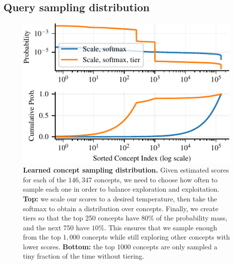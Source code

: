 \subsection{Query sampling distribution}
\label{subsec:tiering}

\begin{figure}[t]
    \centering
    \includegraphics[width=0.7\linewidth]{figures/sampling_dist_shorter.pdf}
    \caption{\textbf{Learned concept sampling distribution.} Given estimated scores for each of the $146{,}347$ concepts, we need to choose how often to sample each one in order to balance exploration and exploitation.
    \textbf{Top:} we scale our scores to a desired temperature, then take the softmax to obtain a distribution over concepts. Finally, we create tiers so that the top 250 concepts have $80\%$ of the probability mass, and the next 750 have $10\%$. This ensures that we sample enough from the top $1{,}000$ concepts while still exploring other concepts with lower scores.
    \textbf{Bottom:} the top 1000 concepts are only sampled a tiny fraction of the time without tiering.}
    \label{fig:sampling_dist}
    \vspace{-0.12in}
\end{figure}

